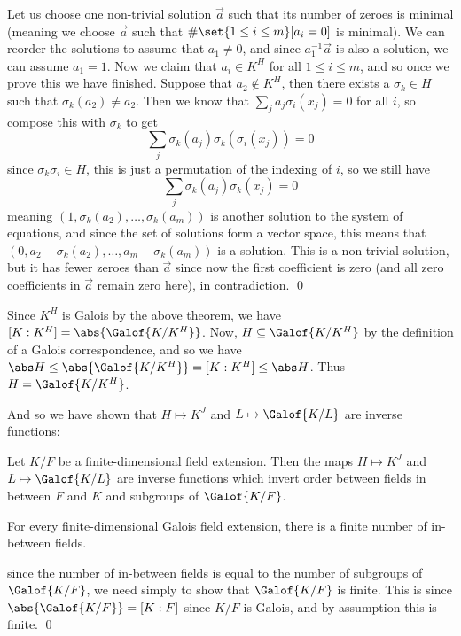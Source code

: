 Let us choose one non-trivial solution $\vec a$ such that its number of zeroes is minimal (meaning we choose $\vec a$ such that $\#\set{1\leq i\leq m}[a_i=0]$ is minimal).
We can reorder the solutions to assume that $a_1\neq0$, and since $a_1^{-1}\vec a$ is also a solution, we can assume $a_1=1$.
Now we claim that $a_i\in K^H$ for all $1\leq i\leq m$, and so once we prove this we have finished.
Suppose that $a_2\notin K^H$, then there exists a $\sigma_k\in H$ such that $\sigma_k(a_2)\neq a_2$.
Then we know that $\sum_ja_j\sigma_i(x_j)=0$ for all $i$, so compose this with $\sigma_k$ to get
$$ \sum_j\sigma_k(a_j)\sigma_k(\sigma_i(x_j)) = 0 $$
since $\sigma_k\sigma_i\in H$, this is just a permutation of the indexing of $i$, so we still have
$$ \sum_j\sigma_k(a_j)\sigma_k(x_j) = 0 $$
meaning $(1,\sigma_k(a_2),\dots,\sigma_k(a_m))$ is another solution to the system of equations, and since the set of solutions form a vector space, this means that
$(0,a_2-\sigma_k(a_2),\dots,a_m-\sigma_k(a_m))$ is a solution.
This is a non-trivial solution, but it has fewer zeroes than $\vec a$ since now the first coefficient is zero (and all zero coefficients in $\vec a$ remain zero here), in contradiction.
\qed

Since $K^H$ is Galois by the above theorem, we have $[K:K^H]=\abs{\Galof{K/K^H}}$.
Now, $H\subseteq\Galof{K/K^H}$ by the definition of a Galois correspondence, and so we have $\abs H\leq\abs{\Galof{K/K^H}}=[K:K^H]\leq\abs H$.
Thus $H=\Galof{K/K^H}$.

And so we have shown that $H\mapsto K^J$ and $L\mapsto\Galof{K/L}$ are inverse functions:

\bthrm[title=The Fundamental Theorem of Galois Theory, name=ftgalois]

    Let $K/F$ be a finite-dimensional field extension.
    Then the maps $H\mapsto K^J$ and $L\mapsto\Galof{K/L}$ are inverse functions which invert order between fields in between $F$ and $K$ and subgroups of $\Galof{K/F}$.

\ethrm

\bcoro

    For every finite-dimensional Galois field extension, there is a finite number of in-between fields.

\ecoro

\Proof since the number of in-between fields is equal to the number of subgroups of $\Galof{K/F}$, we need simply to show that $\Galof{K/F}$ is finite.
This is since $\abs{\Galof{K/F}}=[K:F]$ since $K/F$ is Galois, and by assumption this is finite.
\qed

